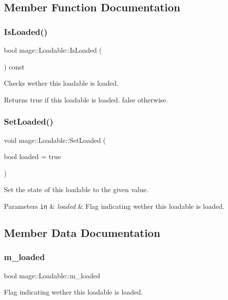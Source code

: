 \subsection{Member Function Documentation}
\hypertarget{classmage_1_1_loadable_a53cfa5beb9b44bbcda0d6166a54b8cb6}{}\label{classmage_1_1_loadable_a53cfa5beb9b44bbcda0d6166a54b8cb6} 
\subsubsection{\texorpdfstring{Is\+Loaded()}{IsLoaded()}}
{\footnotesize\ttfamily bool mage\+::\+Loadable\+::\+Is\+Loaded (\begin{DoxyParamCaption}{ }\end{DoxyParamCaption}) const}

Checks wether this loadable is loaded.

\begin{DoxyReturn}{Returns}
{\ttfamily true} if this loadable is loaded. {\ttfamily false} otherwise. 
\end{DoxyReturn}
\hypertarget{classmage_1_1_loadable_a932ff8b287c8e68e30a13804cba08ff2}{}\label{classmage_1_1_loadable_a932ff8b287c8e68e30a13804cba08ff2} 
\subsubsection{\texorpdfstring{Set\+Loaded()}{SetLoaded()}}
{\footnotesize\ttfamily void mage\+::\+Loadable\+::\+Set\+Loaded (\begin{DoxyParamCaption}\item[{bool}]{loaded = {\ttfamily true} }\end{DoxyParamCaption})\hspace{0.3cm}{\ttfamily [protected]}}

Set the state of this loadable to the given value.


\begin{DoxyParams}[1]{Parameters}
\mbox{\tt in}  & {\em loaded} & Flag indicating wether this loadable is loaded. \\
\hline
\end{DoxyParams}


\subsection{Member Data Documentation}
\hypertarget{classmage_1_1_loadable_a993963fbfeb0f2e2ab9616bf7ef6a0f7}{}\label{classmage_1_1_loadable_a993963fbfeb0f2e2ab9616bf7ef6a0f7} 
\subsubsection{\texorpdfstring{m\+\_\+loaded}{m\_loaded}}
{\footnotesize\ttfamily bool mage\+::\+Loadable\+::m\+\_\+loaded\hspace{0.3cm}{\ttfamily [private]}}

Flag indicating wether this loadable is loaded. 